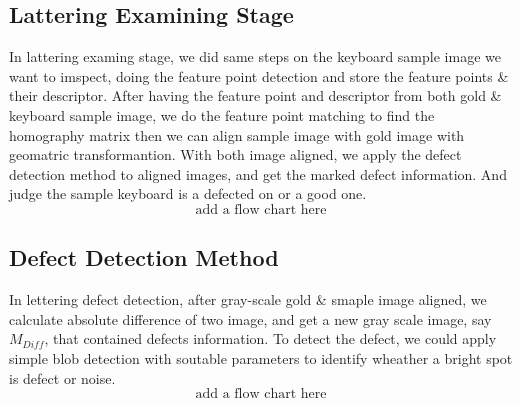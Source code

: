	\subsection{Lattering Examining Stage}
		In lattering examing stage, we did same steps on the keyboard sample image we want to imspect, doing the feature point detection and store the feature points \& their descriptor.
		After having the feature point and descriptor from both gold \& keyboard sample image, we do the feature point matching to find the homography matrix then we can align sample image with gold image with geomatric transformantion. 
		With both image aligned, we apply the defect detection method to aligned images, and get the marked defect information.
		And judge the sample keyboard is a defected on or a good one.
		$$ \textrm{add a flow chart here} $$

	\subsection{Defect Detection Method}
		In lettering defect detection, after gray-scale gold \& smaple image aligned, we calculate absolute difference of two image, and get a new gray scale image, say $M_{Diff}$, that contained defects information.
		To detect the defect, we could apply simple blob detection with soutable parameters to identify wheather a bright spot is defect or noise.
		$$ \textrm{add a flow chart here} $$

